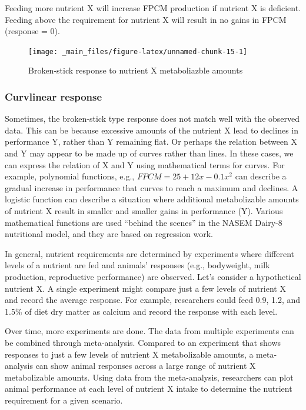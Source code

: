 \documentclass[
]{book}
\begin{document}
Feeding more nutrient X will increase FPCM production if nutrient X is deficient. Feeding above the requirement for nutrient X will result in no gains in FPCM (response = 0).

\begin{figure}

{\centering \texttt{[image: \_main\_files/figure-latex/unnamed-chunk-15-1]} 

}

\caption{Broken-stick response to nutrient X metaboliazble amounts}\label{fig:unnamed-chunk-15}
\end{figure}

\hypertarget{curvlinear-response}{%
\subsubsection{Curvlinear response}\label{curvlinear-response}}

\citet{Pesti2009}

Sometimes, the broken-stick type response does not match well with the observed data. This can be because excessive amounts of the nutrient X lead to declines in performance Y, rather than Y remaining flat. Or perhaps the relation between X and Y may appear to be made up of curves rather than lines. In these cases, we can express the relation of X and Y using mathematical terms for curves. For example, polynomial functions, e.g., \(FPCM = 25 + 12x -0.1x^2\) can describe a gradual increase in performance that curves to reach a maximum and declines. A logistic function can describe a situation where additional metabolizable amounts of nutrient X result in smaller and smaller gains in performance (Y). Various mathematical functions are used ``behind the scenes'' in the NASEM Dairy-8 \citeyearpar{NASEM8} nutritional model, and they are based on regression work.

In general, nutrient requirements are determined by experiments where different levels of a nutrient are fed and animals' responses (e.g., bodyweight, milk production, reproductive performance) are observed. Let's consider a hypothetical nutrient X. A single experiment might compare just a few levels of nutrient X and record the average response. For example, researchers could feed 0.9, 1.2, and 1.5\% of diet dry matter as calcium and record the response with each level.

Over time, more experiments are done. The data from multiple experiments can be combined through meta-analysis. Compared to an experiment that shows responses to just a few levels of nutrient X metabolizable amounts, a meta-analysis can show animal responses across a large range of nutrient X metabolizable amounts. Using data from the meta-analysis, researchers can plot animal performance at each level of nutrient X intake to determine the nutrient requirement for a given scenario.
\end{document}
